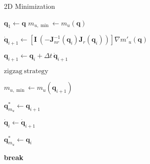 \begin{algorithm}[H]
	\caption{2D Minimization}
	\label{alg:2D_alg}
	\begin{algorithmic}[1]
		\State $\mathbf{q}_1 \leftarrow \mathbf{q}$
		\State $m_{u,\min} \leftarrow m_u(\mathbf{q})$
		
		
		
		\State $\dot{\mathbf{q}}_{i+1} \leftarrow  \left[\mathbf{I} \ (-\mathbf{J}_{nr}^{-1}(\mathbf{q}_i) \mathbf{J}_r(\mathbf{q}_i))  \right ]  \nabla m'_u(\mathbf{q}) $ \label{2D_alg:line:select}
		
		
		\State $\mathbf{q}_{i+1} \leftarrow \mathbf{q}_i + \Delta t \, \dot{\mathbf{q}}_{i+1}$
		
		\State $\mathrm{zigzag \ strategy}$ \label{2D_alg:line:zigzag}
		
		
		\State $m_{u,\min} \leftarrow m_u(\mathbf{q}_{i+1})$
		
		\State $\mathbf{q}_{m_u}^\ast \leftarrow \mathbf{q}_{i+1}$
		
		\State $\dot{\mathbf{q}}_{i} \leftarrow \dot{\mathbf{q}}_{i+1}$
		
		\Else
		
		\State $\mathbf{q}_{m_u}^\ast \leftarrow \mathbf{q}_{i}$		
		
		\State \textbf{break}
		\EndIf
		
		\EndFor
	\end{algorithmic}
\end{algorithm}







